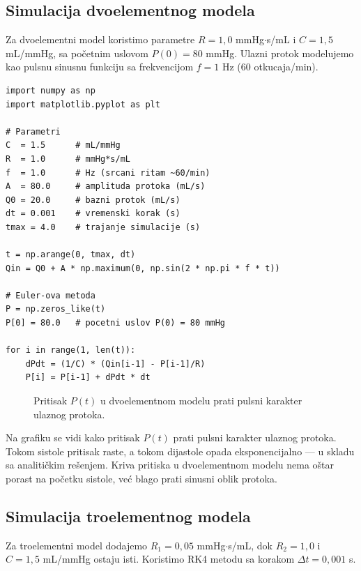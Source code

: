 \documentclass[12pt,a4paper]{article}
\begin{document}
\subsection{Simulacija dvoelementnog modela}

Za dvoelementni model koristimo parametre $R = 1{,}0$ mmHg$\cdot$s/mL i $C = 1{,}5$ mL/mmHg, sa početnim uslovom $P(0) = 80$ mmHg. Ulazni protok modelujemo kao pulsnu sinusnu funkciju sa frekvencijom $f = 1$ Hz (60 otkucaja/min).

\begin{lstlisting}[caption={Simulacija dvoelementnog Windkessel modela (Euler-ova metoda).},label={lst:2elem}]
import numpy as np
import matplotlib.pyplot as plt

# Parametri
C  = 1.5      # mL/mmHg
R  = 1.0      # mmHg*s/mL
f  = 1.0      # Hz (srcani ritam ~60/min)
A  = 80.0     # amplituda protoka (mL/s)
Q0 = 20.0     # bazni protok (mL/s)
dt = 0.001    # vremenski korak (s)
tmax = 4.0    # trajanje simulacije (s)

t = np.arange(0, tmax, dt)
Qin = Q0 + A * np.maximum(0, np.sin(2 * np.pi * f * t))

# Euler-ova metoda
P = np.zeros_like(t)
P[0] = 80.0   # pocetni uslov P(0) = 80 mmHg

for i in range(1, len(t)):
    dPdt = (1/C) * (Qin[i-1] - P[i-1]/R)
    P[i] = P[i-1] + dPdt * dt
\end{lstlisting}

\begin{figure}[H]
    \centering
    \caption{Pritisak $P(t)$ u dvoelementnom modelu prati pulsni karakter ulaznog protoka.}
    \label{fig:sim2}
\end{figure}

Na grafiku se vidi kako pritisak $P(t)$ prati pulsni karakter ulaznog protoka. Tokom sistole pritisak raste, a tokom dijastole opada eksponencijalno --- u skladu sa analitičkim rešenjem. Kriva pritiska u dvoelementnom modelu nema oštar porast na početku sistole, već blago prati sinusni oblik protoka.

\subsection{Simulacija troelementnog modela}

Za troelementni model dodajemo $R_1 = 0{,}05$ mmHg$\cdot$s/mL, dok $R_2 = 1{,}0$ i $C = 1{,}5$ mL/mmHg ostaju isti. Koristimo RK4 metodu sa korakom $\Delta t = 0{,}001$ s.
\end{document}
